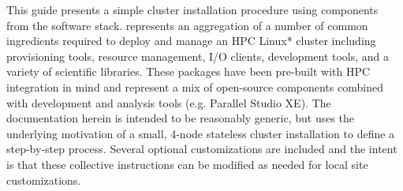 This guide presents a simple cluster installation procedure using components
from the \OHPC{} software stack. \OHPC{} represents an aggregation of a number
of common ingredients required to deploy and manage an HPC Linux* cluster
including provisioning tools, resource management, I/O clients, development
tools, and a variety of scientific libraries. These packages have been
pre-built with HPC integration in mind and represent a mix of open-source
components combined with \Intel{} development and analysis tools
(e.g. \IntelR{} Parallel Studio XE). The documentation herein is intended to
be reasonably generic, but uses the underlying motivation of a small, 4-node
stateless cluster installation to define a step-by-step process. Several
optional customizations are included and the intent is that these collective
instructions can be modified as needed for local site customizations.
